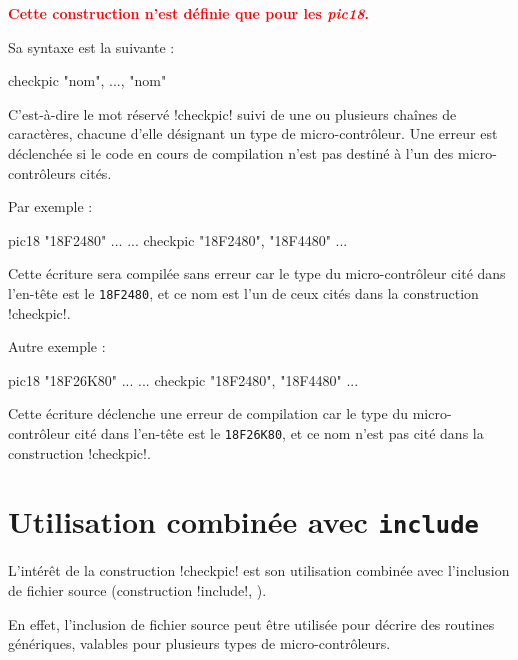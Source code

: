 
\cleardoublepage


\thispagestyle{empty}

\textcolor{red}{\bf Cette construction n'est définie que pour les \emph{pic18}.}

Sa syntaxe est la suivante :

\begin{piccolo}
checkpic "nom", ..., "nom"
\end{piccolo}

C'est-à-dire le mot réservé \pic!checkpic! suivi de une ou plusieurs chaînes de caractères, chacune d'elle désignant un type de micro-contrôleur. Une erreur est déclenchée si le code en cours de compilation n'est pas destiné à l'un des micro-contrôleurs cités.

Par exemple :

\begin{piccolo}
pic18 "18F2480" ...
  ...
checkpic "18F2480", "18F4480"
  ...
\end{piccolo}

Cette écriture sera compilée sans erreur car le type du micro-contrôleur cité dans l'en-tête est le \texttt{18F2480}, et ce nom est l'un de ceux cités dans la construction \pic!checkpic!.

Autre exemple :

\begin{piccolo}
pic18 "18F26K80" ...
  ...
checkpic "18F2480", "18F4480"
  ...
\end{piccolo}

Cette écriture déclenche une erreur de compilation car le type du micro-contrôleur cité dans l'en-tête est le \texttt{18F26K80}, et ce nom n'est pas cité dans la construction \pic!checkpic!.




\section{Utilisation combinée avec \texttt{include}}
L'intérêt de la construction \pic!checkpic! est son utilisation combinée avec l'inclusion de fichier source (construction \pic!include!, ).

En effet, l'inclusion de fichier source peut être utilisée pour décrire des routines génériques, valables pour plusieurs types de micro-contrôleurs.

